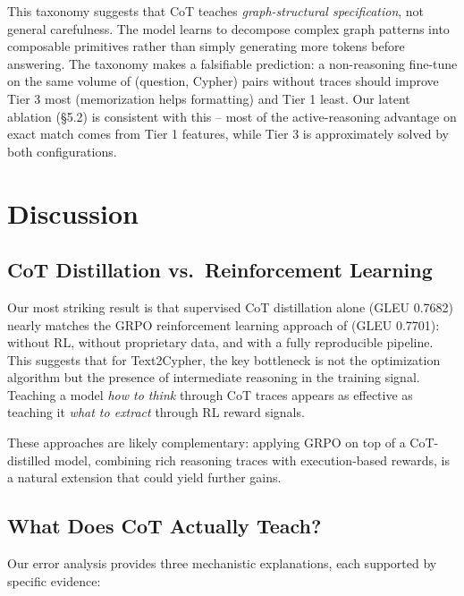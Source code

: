 \documentclass[11pt]{article}
\begin{document}
This taxonomy suggests that CoT teaches \emph{graph-structural specification}, not general carefulness. The model learns to decompose complex graph patterns into composable primitives rather than simply generating more tokens before answering. The taxonomy makes a falsifiable prediction: a non-reasoning fine-tune on the same volume of (question, Cypher) pairs without traces should improve Tier 3 most (memorization helps formatting) and Tier 1 least. Our latent ablation (\S5.2) is consistent with this -- most of the active-reasoning advantage on exact match comes from Tier 1 features, while Tier 3 is approximately solved by both configurations.

\section{Discussion}

\subsection{CoT Distillation vs.\ Reinforcement Learning}

Our most striking result is that supervised CoT distillation alone (GLEU 0.7682) nearly matches the GRPO reinforcement learning approach of \citet{tran2025refining} (GLEU 0.7701): without RL, without proprietary data, and with a fully reproducible pipeline. This suggests that for Text2Cypher, the key bottleneck is not the optimization algorithm but the presence of intermediate reasoning in the training signal. Teaching a model \emph{how to think} through CoT traces appears as effective as teaching it \emph{what to extract} through RL reward signals.

These approaches are likely complementary: applying GRPO on top of a CoT-distilled model, combining rich reasoning traces with execution-based rewards, is a natural extension that could yield further gains.

\subsection{What Does CoT Actually Teach?}

Our error analysis provides three mechanistic explanations, each supported by specific evidence:
\end{document}
